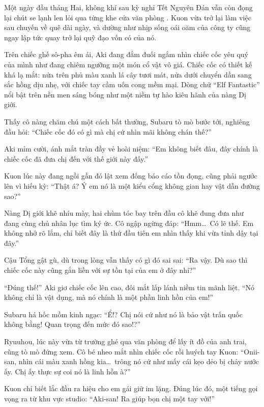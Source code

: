 \documentclass[../main.tex]{subfiles}
\begin{document}
Một ngày đầu tháng Hai, không khí sau kỳ nghỉ Tết Nguyên Đán vẫn còn đọng lại chút se lạnh len lỏi qua từng khe cửa văn phòng \hll. Kuon vừa trở lại làm việc sau chuyến về quê dài ngày, và dường như nhịp sống oái oăm của công ty cũng ngay lập tức quay trở lại quỹ đạo vốn có của nó.

Trên chiếc ghế sô-pha êm ái, Aki đang đắm đuối ngắm nhìn chiếc cốc yêu quý của mình như đang chiêm ngưỡng một món cổ vật vô giá. Chiếc cốc có thiết kế khá lạ mắt: nửa trên phủ màu xanh lá cây tươi mát, nửa dưới chuyển dần sang sắc hồng dịu nhẹ, với chiếc tay cầm uốn cong mềm mại. Dòng chữ ``Elf Fantastic'' nổi bật trên nền men sáng bóng như một niềm tự hào kiêu hãnh của nàng Dị giới.


Thấy cô nàng chăm chú một cách bất thường, Subaru tò mò bước tới, nghiêng đầu hỏi: ``Chiếc cốc đó có gì mà chị cứ nhìn mãi không chán thế?''

Aki mỉm cười, ánh mắt tràn đầy vẻ hoài niệm: ``Em không biết đâu, đây chính là chiếc cốc đã đưa chị đến với thế giới này đấy.''

Kuon lúc này đang ngồi gần đó lật xem đống báo cáo tồn đọng, cũng phải ngước lên vì hiếu kỳ: ``Thật á? Ý em nó là một kiểu cổng không gian hay vật dẫn đường sao?''

Nàng Dị giới khẽ nhíu mày, hai chùm tóc bay trên đầu cô khẽ đung đưa như đang cùng chủ nhân lục tìm ký ức. Cô ngập ngừng đáp: ``Hmm\dots\ Có lẽ thế. Em không nhớ rõ lắm, chỉ biết đây là thứ đầu tiên em nhìn thấy khi vừa tỉnh dậy tại đây.''

Cậu Tổng gật gù, dù trong lòng vẫn thấy có gì đó sai sai: ``Ra vậy. Dù sao thì chiếc cốc này cũng gắn liền với sự tồn tại của em ở đây nhỉ?''

``Đúng thế!'' Aki giơ chiếc cốc lên cao, đôi mắt lấp lánh niềm tin mãnh liệt. ``Nó không chỉ là vật dụng, mà nó chính là một phần linh hồn của em!''

Subaru há hốc mồm kinh ngạc: ``Ể!? Chị nói cứ như nó là bảo vật trấn quốc không bằng! Quan trọng đến mức đó sao!?''

Ryuuhou, lúc này vừa từ trường ghé qua văn phòng để lấy ít đồ của anh trai, cũng tò mò đứng xem. Cô bé nheo mắt nhìn chiếc cốc rồi huých tay Kuon: ``Onii-san, nhìn cái màu xanh hồng kia\dots\ trông nó cứ như mấy cái kẹo dẻo bị chảy nước ấy. Chị ấy thực sự coi nó là linh hồn à?''

Kuon chỉ biết lắc đầu ra hiệu cho em gái giữ im lặng. Đúng lúc đó, một tiếng gọi vọng ra từ khu vực studio: ``Aki-san! Ra giúp bọn chị một tay với!''
\end{document}
